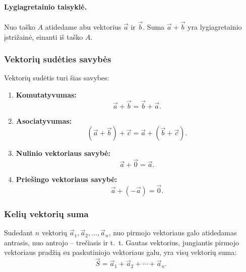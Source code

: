 \paragraph{Lygiagretainio taisyklė.}
Nuo taško $A$ atidedame abu vektorius $\vec{a}$ ir $\vec{b}$.
Suma $\vec{a} + \vec{b}$ yra lygiagretainio įstrižainė, einanti iš taško $A$.

\begin{center}
\end{center}

\subsubsection*{Vektorių sudėties savybės}

\begin{theorem}
Vektorių sudėtis turi šias savybes:
\begin{enumerate}[label=\arabic*°]
  \item \textbf{Komutatyvumas:}
        \[
          \vec{a} + \vec{b} = \vec{b} + \vec{a}.
        \]
  \item \textbf{Asociatyvumas:}
        \[
          (\vec{a} + \vec{b}) + \vec{c} = \vec{a} + (\vec{b} + \vec{c}).
        \]
  \item \textbf{Nulinio vektoriaus savybė:}
        \[
          \vec{a} + \vec{0} = \vec{a}.
        \]
  \item \textbf{Priešingo vektoriaus savybė:}
        \[
          \vec{a} + (-\vec{a}) = \vec{0}.
        \]
\end{enumerate}
\end{theorem}

\subsubsection*{Kelių vektorių suma}

Sudedant $n$ vektorių $\vec{a}_1, \vec{a}_2, \ldots, \vec{a}_n$, nuo pirmojo vektoriaus galo
atidedamas antrasis, nuo antrojo – trečiasis ir t.~t. Gautas vektorius, jungiantis pirmojo
vektoriaus pradžią su paskutiniojo vektoriaus galu, yra visų vektorių suma:
\[
  \vec{S} = \vec{a}_1 + \vec{a}_2 + \cdots + \vec{a}_n.
\]

